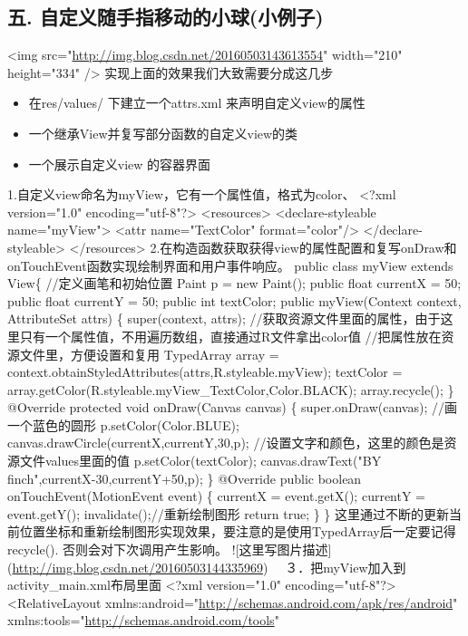\documentclass[9pt, b5paper]{article}
\begin{document}
\subsection{五. 自定义随手指移动的小球(小例子)}
\label{sec-10-5}
<img src="\url{http://img.blog.csdn.net/20160503143613554}" width="210" height="334" />
实现上面的效果我们大致需要分成这几步
\begin{itemize}
\item 在res/values/ 下建立一个attrs.xml 来声明自定义view的属性
\item 一个继承View并复写部分函数的自定义view的类
\item 一个展示自定义view 的容器界面
\end{itemize}
1.自定义view命名为myView，它有一个属性值，格式为color、
<?xml version="1.0" encoding="utf-8"?>
<resources>
    <declare-styleable name="myView">
        <attr name="TextColor" format="color"/>
    </declare-styleable>        
</resources>
2.在构造函数获取获得view的属性配置和复写onDraw和onTouchEvent函数实现绘制界面和用户事件响应。
public class myView extends View\{
    //定义画笔和初始位置
    Paint p = new Paint();
    public float currentX = 50;
    public float currentY = 50;
    public int textColor;
    public myView(Context context, AttributeSet attrs) \{
        super(context, attrs);
        //获取资源文件里面的属性，由于这里只有一个属性值，不用遍历数组，直接通过R文件拿出color值
        //把属性放在资源文件里，方便设置和复用
        TypedArray array = context.obtainStyledAttributes(attrs,R.styleable.myView);
        textColor = array.getColor(R.styleable.myView\_TextColor,Color.BLACK);
        array.recycle();
    \}
    @Override
    protected void onDraw(Canvas canvas) \{
        super.onDraw(canvas);
        //画一个蓝色的圆形
        p.setColor(Color.BLUE);
        canvas.drawCircle(currentX,currentY,30,p);
        //设置文字和颜色，这里的颜色是资源文件values里面的值
        p.setColor(textColor);
        canvas.drawText("BY finch",currentX-30,currentY+50,p);
    \}
    @Override
    public boolean onTouchEvent(MotionEvent event) \{
        currentX = event.getX();
        currentY = event.getY();
        invalidate();//重新绘制图形
        return true;
    \}
\}
这里通过不断的更新当前位置坐标和重新绘制图形实现效果，要注意的是使用TypedArray后一定要记得recycle(). 否则会对下次调用产生影响。
![这里写图片描述](\url{http://img.blog.csdn.net/20160503144335969})　
３．把myView加入到activity\_main.xml布局里面
<?xml version="1.0" encoding="utf-8"?>
<RelativeLayout xmlns:android="\url{http://schemas.android.com/apk/res/android}"
    xmlns:tools="\url{http://schemas.android.com/tools}"
\end{document}
